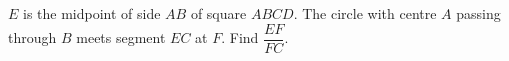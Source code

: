$E$ is the midpoint of side $AB$ of square $ABCD$. The circle with centre $A$ passing through $B$ meets segment $EC$ at $F$. Find $\dfrac{EF}{FC}$.

